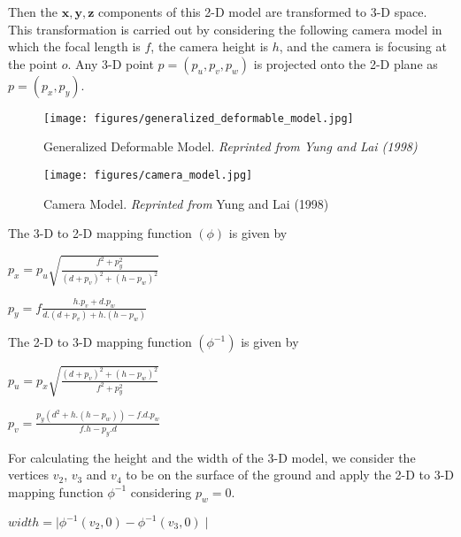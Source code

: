 \documentclass[a4paper]{aitthesis}
\renewcommand{\vec}[1]{\boldsymbol{#1}}
\begin{document}
Then the $\vec{x}, \vec{y}, \vec{z}$ components of this 2-D model are transformed to 3-D space. This transformation is carried out by considering the following camera model in which the focal length is $f$, the camera height is $h$, and the camera is focusing at the point $o$. Any 3-D point $p = (p_u, p_v, p_w)$ is projected onto the 2-D plane as $p = (p_x, p_y).$ 
 
\begin{figure}[h]
    \centering
    \texttt{[image: figures/generalized\_deformable\_model.jpg]}
    \caption{Generalized Deformable Model. \emph{ Reprinted from Yung and Lai (1998)}}
    \label{fig:cap1}
\end{figure}
\begin{figure}[h]
    \centering
    \texttt{[image: figures/camera\_model.jpg]}
    \caption{Camera Model. \emph{ Reprinted from} Yung and Lai (1998)}
    \label{fig:cap1}
\end{figure}

The 3-D to 2-D mapping function $(\phi)$ is given by 
\newline
\newline
\begin{center}
$p_x = p_u \sqrt{\frac{f^2 + p_y^2}{(d + p_v)^2 + (h-p_w)^2}}$
\end{center}

\begin{center}
$p_y = f\frac{h.p_v +d.p_w}{d.(d + p_v) + h.(h - p_w)}$
\end{center}
 
 The 2-D to 3-D mapping function $(\phi^{-1})$ is given by
 
 \begin{center}
 $p_u = p_x\sqrt{\frac{(d + p_v)^2 + (h - p_w)^2}{f^2 + p_y^2}}$
\end{center}  
\begin{center}
$p_v = \frac{p_y(d^2 + h.(h-p_w)) - f.d.p_w}{f.h - p_y.d}$
\end{center}


For calculating the height and the width of the 3-D model, we consider the vertices $v_2$, $v_3$ and $v_4$ to be on the surface of the ground and apply the 2-D to 3-D mapping function $\phi^{-1}$ considering $p_w = 0$.
\newline
\begin{center}
$width = \mid \phi ^ {-1}(v_2, 0) - \phi^{-1}(v_3, 0) \mid $


\end{center}
\end{document}
